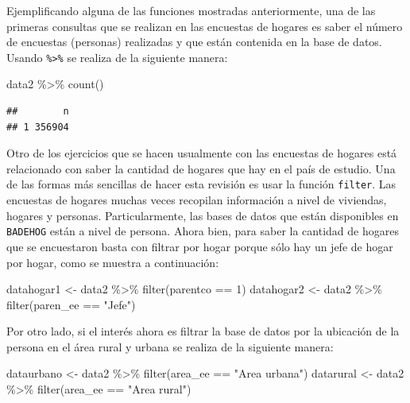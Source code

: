 \documentclass[
  12pt,
]{book}
\newenvironment{Shaded}{\begin{snugshade}}{\end{snugshade}}
\newcommand{\DecValTok}[1]{\textcolor[rgb]{0.00,0.00,0.81}{#1}}
\newcommand{\FunctionTok}[1]{\textcolor[rgb]{0.00,0.00,0.00}{#1}}
\newcommand{\NormalTok}[1]{#1}
\newcommand{\OtherTok}[1]{\textcolor[rgb]{0.56,0.35,0.01}{#1}}
\newcommand{\SpecialCharTok}[1]{\textcolor[rgb]{0.00,0.00,0.00}{#1}}
\newcommand{\StringTok}[1]{\textcolor[rgb]{0.31,0.60,0.02}{#1}}
\begin{document}
Ejemplificando alguna de las funciones mostradas anteriormente, una de las primeras consultas que se realizan en las encuestas de hogares es saber el número de encuestas (personas) realizadas y que están contenida en la base de datos. Usando \texttt{\%\textgreater{}\%} se realiza de la siguiente manera:

\begin{Shaded}
\begin{Highlighting}[]
\NormalTok{data2 }\SpecialCharTok{\%\textgreater{}\%} \FunctionTok{count}\NormalTok{()}
\end{Highlighting}
\end{Shaded}

\begin{verbatim}
##        n
## 1 356904
\end{verbatim}

Otro de los ejercicios que se hacen usualmente con las encuestas de hogares está relacionado con saber la cantidad de hogares que hay en el país de estudio. Una de las formas más sencillas de hacer esta revisión es usar la función \texttt{filter}. Las encuestas de hogares muchas veces recopilan información a nivel de viviendas, hogares y personas. Particularmente, las bases de datos que están disponibles en \texttt{BADEHOG} están a nivel de persona. Ahora bien, para saber la cantidad de hogares que se encuestaron basta con filtrar por hogar porque sólo hay un jefe de hogar por hogar, como se muestra a continuación:

\begin{Shaded}
\begin{Highlighting}[]
\NormalTok{datahogar1 }\OtherTok{\textless{}{-}}\NormalTok{ data2 }\SpecialCharTok{\%\textgreater{}\%} \FunctionTok{filter}\NormalTok{(parentco }\SpecialCharTok{==} \DecValTok{1}\NormalTok{)}
\NormalTok{datahogar2 }\OtherTok{\textless{}{-}}\NormalTok{ data2 }\SpecialCharTok{\%\textgreater{}\%} \FunctionTok{filter}\NormalTok{(paren\_ee }\SpecialCharTok{==} \StringTok{"Jefe"}\NormalTok{) }
\end{Highlighting}
\end{Shaded}

Por otro lado, si el interés ahora es filtrar la base de datos por la ubicación de la persona en el área rural y urbana se realiza de la siguiente manera:

\begin{Shaded}
\begin{Highlighting}[]
\NormalTok{dataurbano }\OtherTok{\textless{}{-}}\NormalTok{ data2 }\SpecialCharTok{\%\textgreater{}\%} 
  \FunctionTok{filter}\NormalTok{(area\_ee }\SpecialCharTok{==} \StringTok{"Area urbana"}\NormalTok{)}
\NormalTok{datarural }\OtherTok{\textless{}{-}}\NormalTok{ data2 }\SpecialCharTok{\%\textgreater{}\%} 
  \FunctionTok{filter}\NormalTok{(area\_ee }\SpecialCharTok{==} \StringTok{"Area rural"}\NormalTok{) }
\end{Highlighting}
\end{Shaded}
\end{document}
